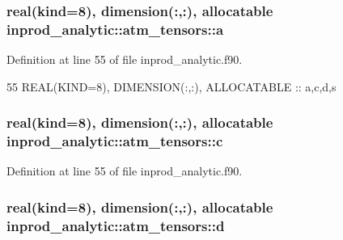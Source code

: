 \subsubsection[{\texorpdfstring{a}{a}}]{\setlength{\rightskip}{0pt plus 5cm}real(kind=8), dimension(\+:,\+:), allocatable inprod\+\_\+analytic\+::atm\+\_\+tensors\+::a\hspace{0.3cm}{\ttfamily [private]}}\hypertarget{structinprod__analytic_1_1atm__tensors_af50962da7a48c98d8b118dee9cc16dcd}{}\label{structinprod__analytic_1_1atm__tensors_af50962da7a48c98d8b118dee9cc16dcd}


Definition at line 55 of file inprod\+\_\+analytic.\+f90.


\begin{DoxyCode}
55      \textcolor{keywordtype}{REAL(KIND=8)}, \textcolor{keywordtype}{DIMENSION(:,:)}, \textcolor{keywordtype}{ALLOCATABLE} :: a,c,d,s
\end{DoxyCode}
\subsubsection[{\texorpdfstring{c}{c}}]{\setlength{\rightskip}{0pt plus 5cm}real(kind=8), dimension(\+:,\+:), allocatable inprod\+\_\+analytic\+::atm\+\_\+tensors\+::c\hspace{0.3cm}{\ttfamily [private]}}\hypertarget{structinprod__analytic_1_1atm__tensors_a6f560bb68ce7081409034cb755e7a164}{}\label{structinprod__analytic_1_1atm__tensors_a6f560bb68ce7081409034cb755e7a164}


Definition at line 55 of file inprod\+\_\+analytic.\+f90.

\subsubsection[{\texorpdfstring{d}{d}}]{\setlength{\rightskip}{0pt plus 5cm}real(kind=8), dimension(\+:,\+:), allocatable inprod\+\_\+analytic\+::atm\+\_\+tensors\+::d\hspace{0.3cm}{\ttfamily [private]}}\hypertarget{structinprod__analytic_1_1atm__tensors_a00e06ac193f03e4dcd337439cc489f78}{}\label{structinprod__analytic_1_1atm__tensors_a00e06ac193f03e4dcd337439cc489f78}


